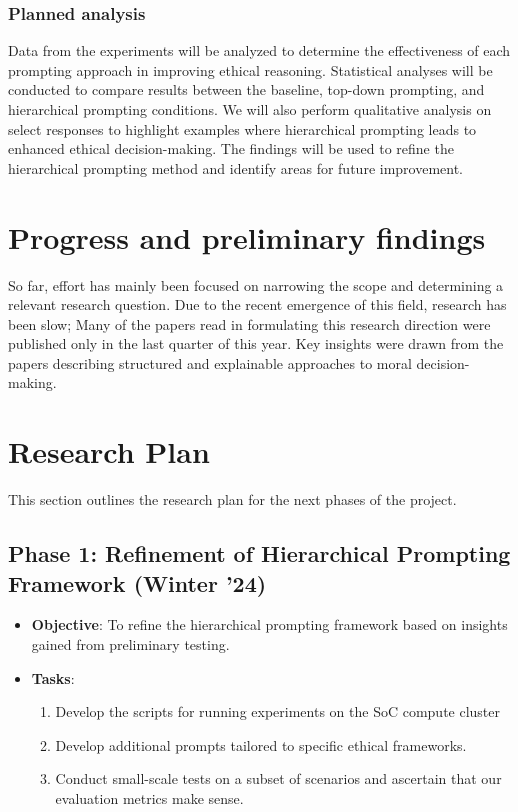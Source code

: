 \documentclass{article}
\begin{document}
\subsubsection{Planned analysis}

Data from the experiments will be analyzed to determine the effectiveness of each prompting approach in improving ethical reasoning. Statistical analyses will be conducted to compare results between the baseline, top-down prompting, and hierarchical prompting conditions. We will also perform qualitative analysis on select responses to highlight examples where hierarchical prompting leads to enhanced ethical decision-making. The findings will be used to refine the hierarchical prompting method and identify areas for future improvement.


\section{Progress and preliminary findings}

So far, effort has mainly been focused on narrowing the scope and determining a relevant research question. Due to the recent emergence of this field, research has been slow; Many of the papers read in formulating this research direction were published only in the last quarter of this year. Key insights were drawn from the papers describing structured and explainable approaches to moral decision-making.


\section{Research Plan}

This section outlines the research plan for the next phases of the project.

\subsection{Phase 1: Refinement of Hierarchical Prompting Framework (Winter '24)}

\begin{itemize}
    \item \textbf{Objective}: To refine the hierarchical prompting framework based on insights gained from preliminary testing.
    \item \textbf{Tasks}:
        \begin{enumerate}
            \item Develop the scripts for running experiments on the SoC compute cluster
            \item Develop additional prompts tailored to specific ethical frameworks.
            \item Conduct small-scale tests on a subset of scenarios and ascertain that our evaluation metrics make sense.
        \end{enumerate}
\end{itemize}
\end{document}
